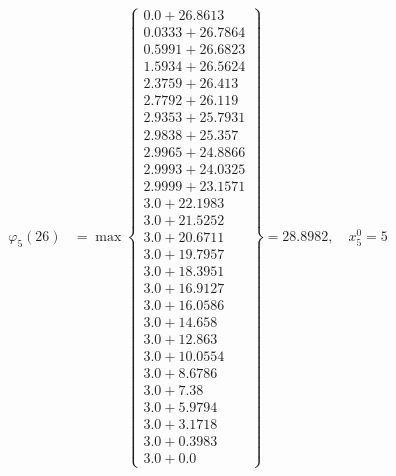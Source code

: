 \documentclass{article}
\begin{document}
\begin{align*}
\varphi_{5}(26) &= \max \left\{ \begin{array}{c}
0.0 + 26.8613 \\
 0.0333 + 26.7864 \\
 0.5991 + 26.6823 \\
 1.5934 + 26.5624 \\
 2.3759 + 26.413 \\
 2.7792 + 26.119 \\
 2.9353 + 25.7931 \\
 2.9838 + 25.357 \\
 2.9965 + 24.8866 \\
 2.9993 + 24.0325 \\
 2.9999 + 23.1571 \\
 3.0 + 22.1983 \\
 3.0 + 21.5252 \\
 3.0 + 20.6711 \\
 3.0 + 19.7957 \\
 3.0 + 18.3951 \\
 3.0 + 16.9127 \\
 3.0 + 16.0586 \\
 3.0 + 14.658 \\
 3.0 + 12.863 \\
 3.0 + 10.0554 \\
 3.0 + 8.6786 \\
 3.0 + 7.38 \\
 3.0 + 5.9794 \\
 3.0 + 3.1718 \\
 3.0 + 0.3983 \\
 3.0 + 0.0
\end{array} \right\}=28.8982, \quad x_{5}^0=5\\
  

\end{align*}
\end{document}
